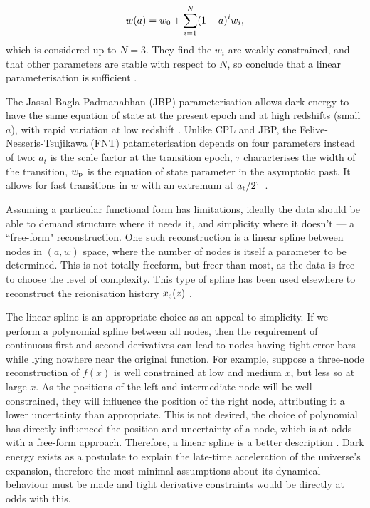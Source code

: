 \documentclass{article}
\begin{document}
\begin{equation}
  w(a)=w_0 +\sum_{i=1}^N(1-a)^iw_i \textrm,
\end{equation}
%
which is considered up to $N=3$. They find the $w_i$ are weakly constrained, and that other parameters are stable with respect to $N$, so conclude that a linear parameterisation is sufficient \cite{planck15xiv}.

The Jassal-Bagla-Padmanabhan (JBP) parameterisation allows dark energy to have the same equation of state at the present epoch and at high redshifts (small $a$), with rapid variation at low redshift \cite{JBP}. Unlike CPL and JBP, the Felive-Nesseris-Tsujikawa (FNT) patameterisation depends on four parameters instead of two: $a_t$ is the scale factor at the transition epoch, $\tau$ characterises the width of the transition, $w_\textrm p$ is the equation of state parameter in the asymptotic past. It allows for fast transitions in $w$ with an extremum at $a_\textrm t/2^\tau$ \cite{FNT}.

Assuming a particular functional form has limitations, ideally the data should be able to demand structure where it needs it, and simplicity where it doesn't --- a ``free-form" reconstruction. One such reconstruction is a linear spline between nodes in $(a, w)$ space, where the number of nodes is itself a parameter to be determined. This is not totally freeform, but freer than most, as the data is free to choose the level of complexity. This type of spline has been used elsewhere to reconstruct the reionisation history $x_\textrm e(z)$ \cite{Millea_2018, Heimersheim_2022}.

The linear spline is an appropriate choice as an appeal to simplicity. If we perform a polynomial spline between all nodes, then the requirement of continuous first and second derivatives can lead to nodes having tight error bars while lying nowhere near the original function. For example, suppose a three-node reconstruction of $f(x)$ is well constrained at low and medium $x$, but less so at large $x$. As the positions of the left and intermediate node will be well constrained, they will influence the position of the right node, attributing it a lower uncertainty than appropriate. This is not desired, the choice of polynomial has directly influenced the position and uncertainty of a node, which is at odds with a free-form approach. Therefore, a linear spline is a better description \cite{Vazquez_2012_pk}. Dark energy exists as a postulate to explain the late-time acceleration of the universe's expansion, therefore the most minimal assumptions about its dynamical behaviour must be made and tight derivative constraints would be directly at odds with this.
\end{document}

